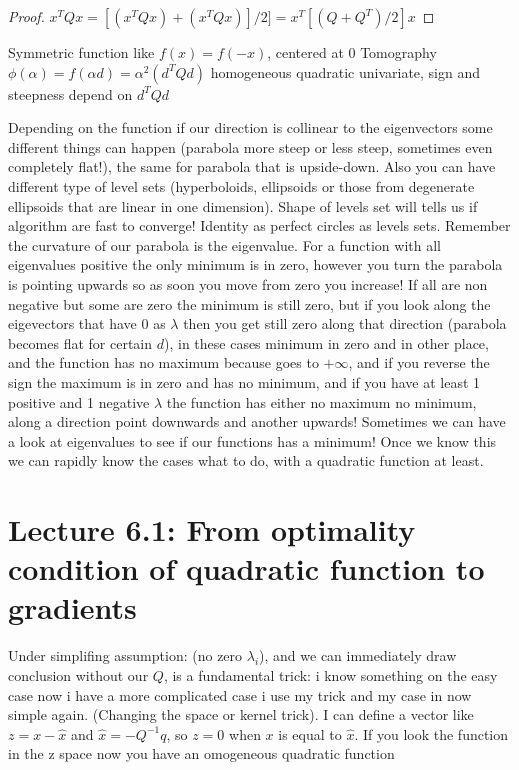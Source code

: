 \documentclass[12pt]{book}
\begin{document}
\begin{proof}
	$x^TQx = [(x^TQx) + (x^TQx)]/2] = x^T[(Q + Q^T)/2]x$ 
\end{proof}
\newline
Symmetric function like $f(x) = f(-x)$, centered at 0
Tomography $\phi(\alpha) = f(\alpha d) = \alpha^2(d^TQd)$ homogeneous quadratic univariate, sign and steepness depend on $d^TQd$

Depending on the function if our direction is collinear to the eigenvectors some different things can happen (parabola more steep or less steep, sometimes even completely flat!), the same for parabola that is upside-down.\newline
Also you can have different type of level sets (hyperboloids, ellipsoids or those from degenerate ellipsoids that are linear in one dimension).
Shape of levels set will tells us if algorithm are fast to converge!
Identity as perfect circles as levels sets. \newline
Remember the curvature of our parabola is the eigenvalue.\newline
For a function with all eigenvalues positive the only minimum is in zero, however you turn the parabola is pointing upwards so as soon you move from zero you increase!\newline\newline 
If all are non negative but some are zero the minimum is still zero, but if you look along the eigevectors that have 0 as $\lambda$ then you get still zero along that direction (parabola becomes flat for certain $d$), in these cases minimum in zero and in other place, and the function has no maximum because goes to $+\infty$, and if you reverse the sign the maximum is in zero and has no minimum, and if you have at least 1 positive and 1 negative $\lambda$ the function has either no maximum no minimum, along a direction point downwards and another upwards!\newline
Sometimes we can have a look at eigenvalues to see if our functions has a minimum! Once we know this we can rapidly know the cases what to do, with a quadratic function at least.

\chapter{Lecture 6.1: From optimality condition of quadratic function to gradients}
Under simplifing assumption: (no zero $\lambda_i$), and we can immediately draw conclusion without our $Q$, is a fundamental trick: i know something on the easy case now i have a more complicated case i use my trick and my case in now simple again. (Changing the space or kernel trick).
I can define a vector like $z = x - \hat{x}$ and $\hat{x} = -Q^{-1}q$, so $z = 0$ when $x$ is equal to $\hat{x}$.\newline
If you look the function in the z space now you have an omogeneous quadratic function
\end{document}
